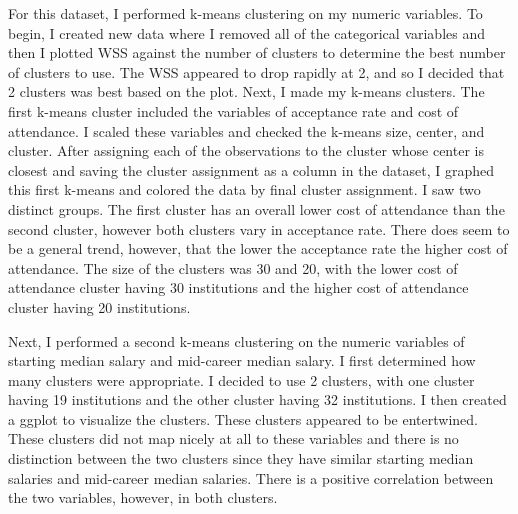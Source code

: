 \documentclass[]{article}
\begin{document}
For this dataset, I performed k-means clustering on my numeric
variables. To begin, I created new data where I removed all of the
categorical variables and then I plotted WSS against the number of
clusters to determine the best number of clusters to use. The WSS
appeared to drop rapidly at 2, and so I decided that 2 clusters was best
based on the plot. Next, I made my k-means clusters. The first k-means
cluster included the variables of acceptance rate and cost of
attendance. I scaled these variables and checked the k-means size,
center, and cluster. After assigning each of the observations to the
cluster whose center is closest and saving the cluster assignment as a
column in the dataset, I graphed this first k-means and colored the data
by final cluster assignment. I saw two distinct groups. The first
cluster has an overall lower cost of attendance than the second cluster,
however both clusters vary in acceptance rate. There does seem to be a
general trend, however, that the lower the acceptance rate the higher
cost of attendance. The size of the clusters was 30 and 20, with the
lower cost of attendance cluster having 30 institutions and the higher
cost of attendance cluster having 20 institutions.

Next, I performed a second k-means clustering on the numeric variables
of starting median salary and mid-career median salary. I first
determined how many clusters were appropriate. I decided to use 2
clusters, with one cluster having 19 institutions and the other cluster
having 32 institutions. I then created a ggplot to visualize the
clusters. These clusters appeared to be entertwined. These clusters did
not map nicely at all to these variables and there is no distinction
between the two clusters since they have similar starting median
salaries and mid-career median salaries. There is a positive correlation
between the two variables, however, in both clusters.
\end{document}

